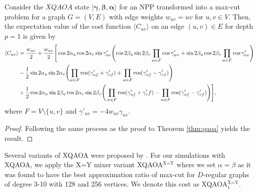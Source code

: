     \begin{widetext}
    \begin{theorem} \label{thm:xqaoa}
        Consider the $XQAOA$ state $|\pmb{\gamma},\pmb{\beta},\pmb{\alpha}\rangle$ for an NPP transformed into a max-cut problem for a graph $G=(V,E)$ with edge weights $w_{uv}=uv$ for $u,v\in V$. Then, the expectation value of the cost function $\langle C_{uv}\rangle$ on an edge $(u,v)\in E$ for depth $p=1$ is given by
        \begin{align*}
            \begin{split}
            \langle C_{uv}\rangle &= \frac{w_{uv}}{2}+\frac{w_{uv}}{2}\Bigg[\cos2\alpha_u\cos2\alpha_v\sin\gamma'_{uv}\lr(){\cos2\beta_u\sin2\beta_v\prod_{w\in F}\cos\gamma'_{wv}+\sin2\beta_u\cos2\beta_v\prod_{w\in F}\cos\gamma'_{uv}}   \\
             &-\frac{1}{2}\sin2\alpha_u\sin2\alpha_v\lr(){\prod_{w\in F} \cos(\gamma'_{uf}+\gamma'_{vf})+\prod_{w\in F}\cos(\gamma'_{uf}-\gamma'_{vf})} \\
             & +\frac{1}{2}\cos2\alpha_u\sin2\beta_u\cos2\alpha_v\sin2\beta_v\Bigg(\prod_{w\in F}\cos(\gamma'_{uf}+\gamma'_vf)-\prod_{w\in F}\cos(\gamma'_{uf}-\gamma'_{vf})\Bigg)\Bigg],
            \end{split}
        \end{align*}
        where $F=V \setminus \{u,v\}$ and $\gamma'_{uv} = -4w_{uv}\gamma_{uv}$.
    \end{theorem}
    \end{widetext}
    \begin{proof}
        Following the same process as the proof to Theorem \ref{thm:qaoa} yields the result.
    \end{proof}

    Several variants of XQAOA were proposed by \citet{vijendran2023expressive}. For our simulations with XQAOA, we apply the X=Y mixer variant XQAOA$^{\text{X=Y}}$ where we set $\alpha=\beta$ as it was found to have the best approximation ratio of max-cut for $D$-regular graphs of degree 3-10 with 128 and 256 vertices. We denote this cost as XQAOA$_1^\text{X=Y}$.
